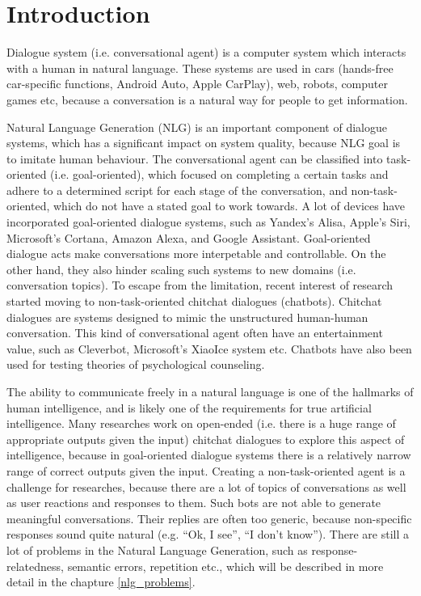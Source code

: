 \chapter{Introduction}\label{introduction}
Dialogue system (i.e. conversational agent) is a computer system which interacts with a human in natural language. These systems are used in cars (hands-free car-specific functions, Android Auto, Apple CarPlay), web, robots, computer games etc, because a conversation is a natural way for people to get information. 

Natural Language Generation (NLG) is an important component of dialogue systems, which has a significant impact on system quality, because NLG goal is to imitate human behaviour. The conversational agent can be classified into task-oriented (i.e. goal-oriented), which focused on completing a certain tasks and adhere to a determined script for each stage of the conversation, and non-task-oriented, which do not have a stated goal to work towards. A lot of devices have incorporated goal-oriented dialogue systems, such as Yandex’s Alisa, Apple’s Siri, Microsoft’s Cortana, Amazon Alexa, and Google Assistant. Goal-oriented dialogue acts make conversations more interpetable and controllable. On the other hand, they also hinder scaling such systems to new domains (i.e. conversation topics). To escape from the limitation, recent interest of research started moving to non-task-oriented chitchat dialogues (chatbots). Chitchat dialogues are systems designed to mimic the unstructured human-human conversation. This kind of conversational agent often have an entertainment value, such as Cleverbot, Microsoft's XiaoIce system etc. Chatbots have also been used for testing theories of psychological counseling.

The ability to communicate freely in a natural language is one of the hallmarks of human intelligence, and is likely one of the requirements for true artificial intelligence. Many researches work on open-ended (i.e. there is a huge range of appropriate outputs given the input) chitchat dialogues to explore this aspect of intelligence, because in goal-oriented dialogue systems there is a relatively narrow range of correct outputs given the input. 
Creating a non-task-oriented agent is a challenge for researches, because there are a lot of topics of conversations as well as user reactions and responses to them. Such bots are not able to generate meaningful conversations. Their replies are often too generic, because non-specific responses sound quite natural (e.g. ``Ok, I see'', ``I don't know''). There are still a lot of problems in the Natural Language Generation, such as response-relatedness, semantic errors, repetition etc., which will be described in more detail in the chapture \ref{nlg_problems}. 

